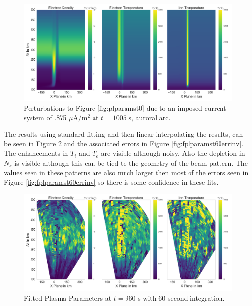 \begin{figure}[!ht]
\centering
\includegraphics[width=6in]{1005_15_int}
\caption{Perturbations to Figure \ref{fig:plparamst0} due to an imposed current system of .875 $\mu$A/m$^2$ at $t=1005$ s, auroral arc.}
\label{fig:plparamst1005inv}
\end{figure}

The results using standard fitting and then linear interpolating the results, can be seen in Figure \ref{fig:fplparamst60inv} and the associated errors in Figure \ref{fig:fplparamst60errinv}. The enhancements in $T_i$ and $T_e$ are visible although noisy. Also the depletion in $N_e$ is visible although this can be tied to the geometry of the beam pattern. The values seen in these patterns are also much larger then most of the errors seen in Figure \ref{fig:fplparamst60errinv} so there is some confidence in these fits.

\begin{figure}[!ht]
\centering
\includegraphics[width=6in]{0960_60_int}
\caption{Fitted Plasma Parameters at $t=960$ s with 60 second integration.}
\label{fig:fplparamst60inv}
\end{figure}

